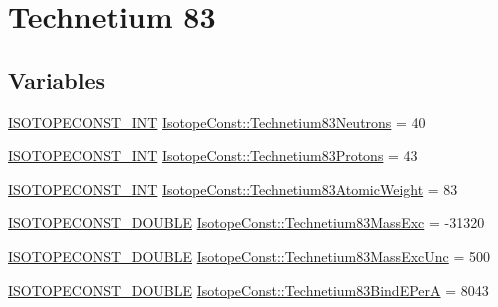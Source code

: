 \hypertarget{group___isotope_const-_technetium-_tc83}{}\section{Technetium 83}
\label{group___isotope_const-_technetium-_tc83}
\subsection*{Variables}
\begin{DoxyCompactItemize}
\item 
\mbox{\hyperlink{group___isotope_const-_macros_ga5f18360b3e99483a35c32d789e62621c}{I\+S\+O\+T\+O\+P\+E\+C\+O\+N\+S\+T\+\_\+\+I\+NT}} \mbox{\hyperlink{group___isotope_const-_technetium-_tc83_ga4dd7e04bb0f5f92ccf8efbce3716c6a4}{Isotope\+Const\+::\+Technetium83\+Neutrons}} = 40
\item 
\mbox{\hyperlink{group___isotope_const-_macros_ga5f18360b3e99483a35c32d789e62621c}{I\+S\+O\+T\+O\+P\+E\+C\+O\+N\+S\+T\+\_\+\+I\+NT}} \mbox{\hyperlink{group___isotope_const-_technetium-_tc83_gaa274c19816c1aa9b59d8d338dfaff2c1}{Isotope\+Const\+::\+Technetium83\+Protons}} = 43
\item 
\mbox{\hyperlink{group___isotope_const-_macros_ga5f18360b3e99483a35c32d789e62621c}{I\+S\+O\+T\+O\+P\+E\+C\+O\+N\+S\+T\+\_\+\+I\+NT}} \mbox{\hyperlink{group___isotope_const-_technetium-_tc83_ga6216b6f16b7616d528f23399c7039480}{Isotope\+Const\+::\+Technetium83\+Atomic\+Weight}} = 83
\item 
\mbox{\hyperlink{group___isotope_const-_macros_ga8f45a7272ce02c0b4c65c44636ed719a}{I\+S\+O\+T\+O\+P\+E\+C\+O\+N\+S\+T\+\_\+\+D\+O\+U\+B\+LE}} \mbox{\hyperlink{group___isotope_const-_technetium-_tc83_ga5a13fb9f884457c99b266d617ea016fd}{Isotope\+Const\+::\+Technetium83\+Mass\+Exc}} = -\/31320
\item 
\mbox{\hyperlink{group___isotope_const-_macros_ga8f45a7272ce02c0b4c65c44636ed719a}{I\+S\+O\+T\+O\+P\+E\+C\+O\+N\+S\+T\+\_\+\+D\+O\+U\+B\+LE}} \mbox{\hyperlink{group___isotope_const-_technetium-_tc83_gaa5f1faed84e2848e8ebd89cc0cea8fa8}{Isotope\+Const\+::\+Technetium83\+Mass\+Exc\+Unc}} = 500
\item 
\mbox{\hyperlink{group___isotope_const-_macros_ga8f45a7272ce02c0b4c65c44636ed719a}{I\+S\+O\+T\+O\+P\+E\+C\+O\+N\+S\+T\+\_\+\+D\+O\+U\+B\+LE}} \mbox{\hyperlink{group___isotope_const-_technetium-_tc83_ga4c3d17d844d0e60c4333149a7f9c5ade}{Isotope\+Const\+::\+Technetium83\+Bind\+E\+PerA}} = 8043
\item 

\end{DoxyCompactItemize}
